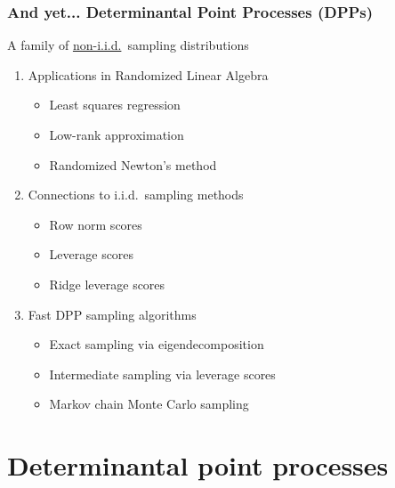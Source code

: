 \documentclass[handout]{beamer}
\begin{document}
  \begin{frame}
    \frametitle{And yet... Determinantal Point Processes (DPPs)}
A family of \underline{non-i.i.d.}~sampling distributions\pause
    
    \begin{enumerate}
    \item Applications in Randomized Linear Algebra\pause
      \begin{itemize}
      \item Least squares regression \cite{unbiased-estimates,leveraged-volume-sampling}\pause
      \item Low-rank approximation
        \cite{pca-volume-sampling,more-efficient-volume-sampling,nystrom-multiple-descent}\pause
        \item Randomized Newton's method \cite{determinantal-averaging,randomized-newton}
        \end{itemize}\pause
      \item Connections to i.i.d.~sampling methods\pause
        \begin{itemize}
        \item Row norm scores\pause
        \item Leverage scores\pause
        \item Ridge leverage scores\pause
        \end{itemize}
      \item Fast DPP sampling algorithms\pause
        \begin{itemize}
        \item Exact sampling via eigendecomposition \cite{dpp-independence,k-dpp}\pause
        \item Intermediate sampling via leverage scores
          \cite{dpp-intermediate,dpp-sublinear}\pause
        \item Markov chain Monte Carlo sampling \cite{rayleigh-mcmc}
        \end{itemize}
    \end{enumerate}
  \end{frame}

\section{Determinantal point processes}
  
\end{document}
